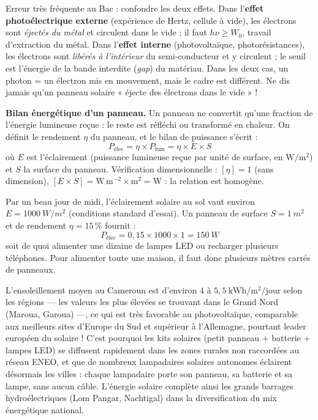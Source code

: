 \documentclass[11pt]{article}
\newcommand{\cle}[1]{{\popxbold\color{popdark}#1}}
\begin{document}
\begin{attention}
Erreur très fréquente au Bac : confondre les deux effets. Dans l'\textbf{effet photoélectrique externe} (expérience de Hertz, cellule à vide), les électrons sont \emph{éjectés du métal} et circulent dans le vide ; il faut $h\nu \geq W_0$, travail d'extraction du métal. Dans l'\textbf{effet interne} (photovoltaïque, photorésistances), les électrons sont \emph{libérés à l'intérieur} du semi-conducteur et y circulent ; le seuil est l'énergie de la bande interdite (\emph{gap}) du matériau. Dans les deux cas, un photon = un électron mis en mouvement, mais le cadre est différent. Ne dis jamais qu'un panneau solaire « éjecte des électrons dans le vide » !
\end{attention}

\textbf{Bilan énergétique d'un panneau.} Un panneau ne convertit qu'une fraction de l'énergie lumineuse reçue : le reste est réfléchi ou transformé en chaleur. On définit le \cle{rendement} $\eta$ du panneau, et le bilan de puissance s'écrit :
\[ P_{\text{élec}} = \eta \times P_{\text{lum}} = \eta \times E \times S \]
où $E$ est l'éclairement (puissance lumineuse reçue par unité de surface, en $\mathrm{W/m^2}$) et $S$ la surface du panneau. Vérification dimensionnelle : $[\eta] = 1$ (sans dimension), $[E \times S] = \mathrm{W\,m^{-2}} \times \mathrm{m^2} = \mathrm{W}$ : la relation est homogène.

\begin{exemplebox}
Par un beau jour de midi, l'éclairement solaire au sol vaut environ $E = \SI{1000}{W/m^2}$ (conditions standard d'essai). Un panneau de surface $S = \SI{1}{m^2}$ et de rendement $\eta = 15\,\%$ fournit :
\[ P_{\text{élec}} = 0{,}15 \times 1000 \times 1 = \SI{150}{W} \]
soit de quoi alimenter une dizaine de lampes LED ou recharger plusieurs téléphones. Pour alimenter toute une maison, il faut donc plusieurs mètres carrés de panneaux.
\end{exemplebox}

\begin{savaistu}
L'ensoleillement moyen au Cameroun est d'environ $4$ à $5{,}5\ \mathrm{kWh/m^2/jour}$ selon les régions — les valeurs les plus élevées se trouvant dans le Grand Nord (Maroua, Garoua) —, ce qui est très favorable au photovoltaïque, comparable aux meilleurs sites d'Europe du Sud et supérieur à l'Allemagne, pourtant leader européen du solaire ! C'est pourquoi les \cle{kits solaires} (petit panneau + batterie + lampes LED) se diffusent rapidement dans les zones rurales non raccordées au réseau ENEO, et que de nombreux \cle{lampadaires solaires autonomes} éclairent désormais les villes : chaque lampadaire porte son panneau, sa batterie et sa lampe, sans aucun câble. L'énergie solaire complète ainsi les grands barrages hydroélectriques (Lom Pangar, Nachtigal) dans la diversification du mix énergétique national.
\end{savaistu}
\end{document}
